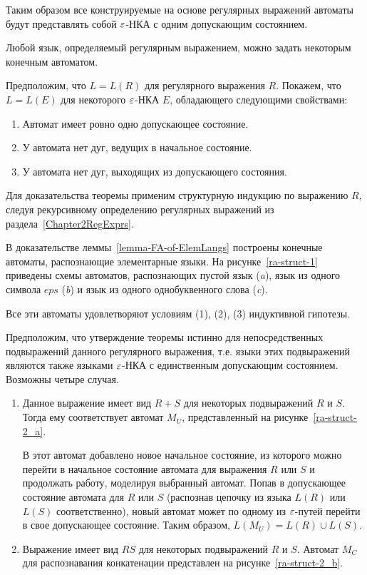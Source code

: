 Таким образом все конструируемые на основе регулярных выражений автоматы будут представлять собой $\varepsilon$-НКА с одним допускающим состоянием.
\begin{mytheorem}
Любой язык, определяемый регулярным выражением, можно задать некоторым конечным автоматом.
\end{mytheorem}
\begin{myproof}
Предположим, что $L = L(R)$ для регулярного выражения $R$. Покажем, что  $L = L(E)$ для некоторого $\varepsilon$-НКА $E$, обладающего следующими свойствами:
\begin{enumerate}
	\item Автомат имеет ровно одно допускающее состояние.
	\item У автомата нет дуг, ведущих в начальное состояние.
	\item У автомата нет дуг, выходящих из допускающего состояния.
\end{enumerate}
Для доказательства теоремы применим структурную индукцию по выражению $R$, следуя рекурсивному определению регулярных выражений из раздела~\ref{Chapter2RegExprs}.

В доказательстве леммы~\ref{lemma-FA-of-ElemLangs} построены конечные автоматы, распознающие элементарные языки. На рисунке~\ref{ra-struct-1} приведены схемы автоматов, распознающих пустой язык (\textsl{a}), язык из одного символа $eps$ (\textsl{b}) и язык из одного однобуквенного слова (\textsl{c}). 



Все эти автоматы удовлетворяют условиям (1), (2), (3) индуктивной гипотезы.

Предположим, что утверждение теоремы истинно для непосредственных подвыражений данного регулярного выражения, т.е. языки этих подвыражений являются также языками $\varepsilon$-НКА с единственным допускающим состоянием. Возможны четыре случая.
\begin{enumerate}
	\item Данное выражение имеет вид $R + S$ для некоторых подвыражений $R$ и $S$. Тогда ему соответствует автомат $M_U$, представленный на рисунке~\ref{ra-struct-2_a}.
	
	

В этот автомат добавлено новое начальное состояние, из которого можно перейти в начальное состояние автомата для выражения $R$ или $S$ и продолжать работу, моделируя выбранный автомат. Попав в допускающее состояние автомата для $R$ или $S$ (распознав цепочку из языка $L(R)$ или $L(S)$ соответственно), новый автомат может по одному из $\varepsilon$-путей перейти в свое допускающее состояние. Таким образом,  $L(M_U) = L(R) \cup L(S)$.
	\item Выражение имеет вид $RS$ для некоторых подвыражений $R$ и $S$. Автомат $M_C$ для распознавания конкатенации представлен на рисунке~\ref{ra-struct-2_b}.
	

\end{enumerate}
\end{myproof}

